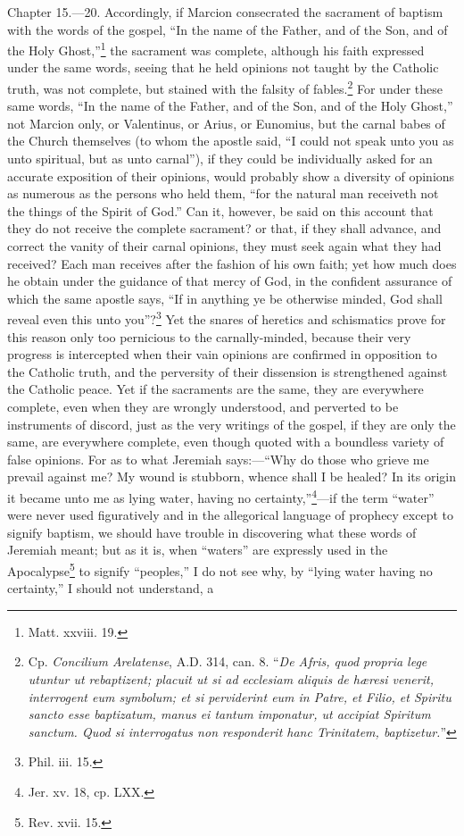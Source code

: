 Chapter 15.—20. Accordingly, if Marcion consecrated the sacrament of baptism with the words of the gospel, ``In the name of the Father, and of the Son, and of the Holy Ghost,''\footnote{\par  Matt. xxviii. 19.} the sacrament was complete, although his faith expressed under the same words, seeing that he held opinions not taught by the Catholic truth, was not complete, but stained with the falsity of fables.\footnote{\par  Cp. \emph{Concilium Arelatense}, A.D. 314, can. 8. ``\emph{De Afris, quod propria lege utuntur ut rebaptizent; placuit ut si ad ecclesiam aliquis de hæresi venerit, interrogent eum symbolum; et si perviderint eum in Patre, et Filio, et Spiritu sancto esse baptizatum, manus ei tantum imponatur, ut accipiat Spiritum sanctum. Quod si interrogatus non responderit hanc Trinitatem, baptizetur.}''} For under these same words, ``In the name of the Father, and of the Son, and of the Holy Ghost,'' not Marcion only, or Valentinus, or Arius, or Eunomius, but the carnal babes of the Church themselves (to whom the apostle said, ``I could not speak unto you as unto spiritual, but as unto carnal''), if they could be individually asked for an accurate exposition of their opinions, would probably show a diversity of opinions as numerous as the persons who held them, ``for the natural man receiveth not the things of the Spirit of God.'' Can it, however, be said on this account that they do not receive the complete sacrament? or that, if they shall advance, and correct the vanity of their carnal opinions, they must seek again what they had received? Each man receives after the fashion of his own faith; yet how much does he obtain under the guidance of that mercy of God, in the confident assurance of which the same apostle says, ``If in anything ye be otherwise minded, God shall reveal even this unto you''?\footnote{\par  Phil. iii. 15.} Yet the snares of heretics and schismatics prove for this reason only too pernicious to the carnally-minded, because their very progress is intercepted when their vain opinions are confirmed in opposition to the Catholic truth, and the perversity of their dissension is strengthened against the Catholic peace. Yet if the sacraments are the same, they are everywhere complete, even when they are wrongly understood, and perverted to be instruments of discord, just as the very writings of the gospel, if they are only the same, are everywhere complete, even though quoted with a boundless variety of false opinions. For as to what Jeremiah says:—``Why do those who grieve me prevail against me? My wound is stubborn, whence shall I be healed? In its origin it became unto me as lying water, having no certainty,''\footnote{\par  Jer. xv. 18, cp. LXX.}—if the term ``water'' were never used figuratively and in the allegorical language of prophecy except to signify baptism, we should have trouble in discovering what these words of Jeremiah meant; but as it is, when ``waters'' are expressly used in the Apocalypse\footnote{\par  Rev. xvii. 15.} to signify ``peoples,'' I do not see why, by ``lying water having no certainty,'' I should not understand, a 